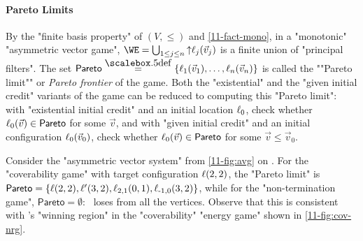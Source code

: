 \paragraph{Pareto Limits}\AP By the "finite basis property" of
$(V,{\leq})$ and \cref{11-fact-mono}, in a "monotonic" "asymmetric
vector game", $\WE=\bigcup_{1\leq j\leq n}{\uparrow}\loc_j(\vec v_j)$
is a finite union of "principal filters".  The set
$\mathsf{Pareto}\eqdef\{\loc_1(\vec v_1),\dots,\loc_n(\vec v_n)\}$ is
called the ""Pareto limit"" or \emph{Pareto frontier} of the game.
Both the "existential" and the "given initial credit" variants of the
game can be reduced to computing this "Pareto limit": with
"existential initial credit" and an initial location $\ell_0$, check
whether $\ell_0(\vec v)\in\mathsf{Pareto}$ for some $\vec v$, and with
"given initial credit" and an initial configuration $\ell_0(\vec v_0)$, check
whether $\ell_0(\vec v)\in\mathsf{Pareto}$ for some $\vec v\leq\vec
v_0$.
\begin{example}
  Consider the "asymmetric vector system" from \cref{11-fig:avg} on
  .  For the "coverability game" with target
  configuration $\ell(2,2)$, the "Pareto limit" is
  $\mathsf{Pareto}=\{\ell(2,2),\ell'(3,2),\ell_{2,1}(0,1),\ell_{\text-1,0}(3,2)\}$,
  while for the "non-termination game", $\mathsf{Pareto}=\emptyset$:
  \Eve\ loses from all the vertices.  Observe that this is consistent
  with \Eve's "winning region" in the "coverability" "energy game"
  shown in \cref{11-fig:cov-nrg}.
\end{example}


